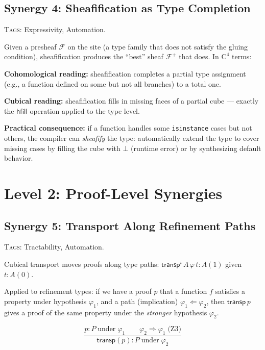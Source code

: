 \documentclass[11pt,a4paper]{article}
\theoremstyle{definition}
\theoremstyle{plain}
\newcommand{\presheaf}{\mathcal{F}}
\newcommand{\transp}{\mathsf{transp}}
\newcommand{\hfilling}{\mathsf{hfill}}
\begin{document}
\subsection{Synergy 4: Sheafification as Type Completion}
\label{sec:syn-sheafification}

\textsc{Tags:} Expressivity, Automation.

\medskip\noindent
Given a presheaf $\presheaf$ on the site (a type family that does
not satisfy the gluing condition), sheafification produces the
``best'' sheaf $\presheaf^+$ that does.  In $\mathrm{C}^4$ terms:

\textbf{Cohomological reading:} sheafification completes a partial
type assignment (e.g., a function defined on some but not all
branches) to a total one.

\textbf{Cubical reading:} sheafification fills in missing faces
of a partial cube --- exactly the $\hfilling$ operation applied to
the type level.

\textbf{Practical consequence:} if a function handles some
\texttt{isinstance} cases but not others, the compiler can
\emph{sheafify} the type: automatically extend the type to cover
missing cases by filling the cube with $\bot$ (runtime error)
or by synthesizing default behavior.


\section{Level 2: Proof-Level Synergies}
\label{sec:syn-proofs}


\subsection{Synergy 5: Transport Along Refinement Paths}
\label{sec:syn-transport-ref}

\textsc{Tags:} Tractability, Automation.

\medskip\noindent
Cubical transport moves proofs along type paths:
$\transp^i\,A\,\varphi\,t : A(1)$ given $t : A(0)$.

Applied to refinement types: if we have a proof $p$ that a function
$f$ satisfies a property under hypothesis $\varphi_1$, and a path
(implication) $\varphi_1 \Leftarrow \varphi_2$, then
$\transp\,p$ gives a proof of the same property under the
\emph{stronger} hypothesis $\varphi_2$.

\[
  \frac{
    p : P\;\text{under}\;\varphi_1
    \qquad
    \varphi_2 \Rightarrow \varphi_1 \;\text{(Z3)}
  }{
    \transp(p) : P\;\text{under}\;\varphi_2
  }
\]
\end{document}
